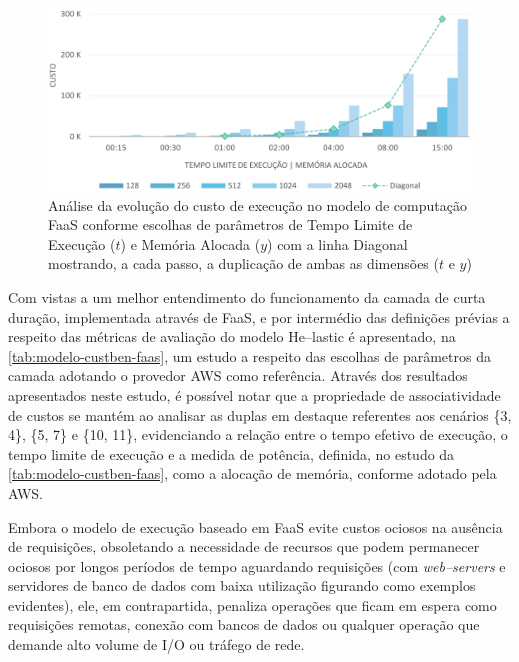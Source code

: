 \documentclass[english,brazilian]{UNISINOSmonografia} %
\newcommand\defaultFigureWidth{0.9}
\begin{document}
\begin{figure}[tb]
	\centering%
	\begin{minipage}{\defaultFigureWidth\textwidth}
		\caption[Análise da evolução do custo de execução no modelo de computação FaaS conforme escolhas de parâmetros de Tempo Limite de Execução ($t$) e Memória Alocada ($y$)]{Análise da evolução do custo de execução no modelo de computação FaaS conforme escolhas de parâmetros de Tempo Limite de Execução ($t$) e Memória Alocada ($y$) com a linha Diagonal mostrando, a cada passo, a duplicação de ambas as dimensões ($ t $ e $ y $)}
		\label{fig:modelo-custben-faas}
		\vspace{1ex}
		\includegraphics[width=\textwidth]{modelo-custben-faas}
	\end{minipage}
\end{figure}


Com vistas a um melhor entendimento do funcionamento da camada de curta duração, implementada através de FaaS, e por intermédio das definições prévias a respeito das métricas de avaliação do modelo \textsf{He}--lastic é apresentado, na \autoref{tab:modelo-custben-faas}, um estudo a respeito das escolhas de parâmetros da camada adotando o provedor AWS como referência.
Através dos resultados apresentados neste estudo, é possível notar que a propriedade de associatividade de custos se mantém ao analisar as duplas em destaque referentes aos cenários \{3, 4\}, \{5, 7\} e \{10, 11\}, evidenciando a relação entre o tempo efetivo de execução, o tempo limite de execução e a medida de potência, definida, no estudo da \autoref{tab:modelo-custben-faas}, como a alocação de memória, conforme adotado pela AWS.


Embora o modelo de execução baseado em FaaS evite custos ociosos na ausência de requisições, obsoletando a necessidade de recursos que podem permanecer ociosos por longos períodos de tempo aguardando requisições (com \textit{web--servers} e servidores de banco de dados com baixa utilização figurando como exemplos evidentes), ele, em contrapartida, penaliza operações que ficam em espera como requisições remotas, conexão com bancos de dados ou qualquer operação que demande alto volume de I/O ou tráfego de rede.
\end{document}
